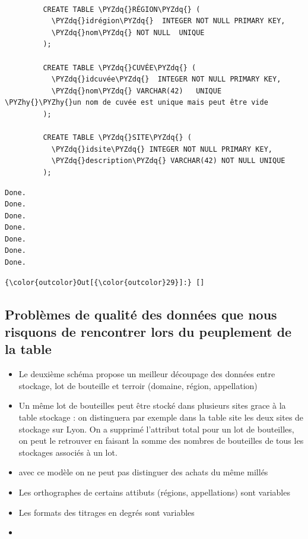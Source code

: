 \documentclass[11pt]{article}
\providecommand{\tightlist}{%
      \setlength{\itemsep}{0pt}\setlength{\parskip}{0pt}}
\def\PYZhy{\char`\-}
\def\PYZdq{\char`\"}
\begin{document}
\begin{Verbatim}[commandchars=\\\{\}]
         
         CREATE TABLE \PYZdq{}RÉGION\PYZdq{} (
           \PYZdq{}idrégion\PYZdq{}  INTEGER NOT NULL PRIMARY KEY,
           \PYZdq{}nom\PYZdq{} NOT NULL  UNIQUE
         );
         
         CREATE TABLE \PYZdq{}CUVÉE\PYZdq{} (
           \PYZdq{}idcuvée\PYZdq{}  INTEGER NOT NULL PRIMARY KEY,
           \PYZdq{}nom\PYZdq{} VARCHAR(42)   UNIQUE                \PYZhy{}\PYZhy{}un nom de cuvée est unique mais peut être vide
         );
         
         CREATE TABLE \PYZdq{}SITE\PYZdq{} (
           \PYZdq{}idsite\PYZdq{} INTEGER NOT NULL PRIMARY KEY,
           \PYZdq{}description\PYZdq{} VARCHAR(42) NOT NULL UNIQUE  
         );
\end{Verbatim}


    \begin{Verbatim}[commandchars=\\\{\}]
Done.
Done.
Done.
Done.
Done.
Done.
Done.

    \end{Verbatim}

\begin{Verbatim}[commandchars=\\\{\}]
{\color{outcolor}Out[{\color{outcolor}29}]:} []
\end{Verbatim}
            
    \hypertarget{probluxe8mes-de-qualituxe9-des-donnuxe9es-que-nous-risquons-de-rencontrer-lors-du-peuplement-de-la-table}{%
\subsection{Problèmes de qualité des données que nous risquons de
rencontrer lors du peuplement de la
table}\label{probluxe8mes-de-qualituxe9-des-donnuxe9es-que-nous-risquons-de-rencontrer-lors-du-peuplement-de-la-table}}

\begin{itemize}
\tightlist
\item
  Le deuxième schéma propose un meilleur découpage des données entre
  stockage, lot de bouteille et terroir (domaine, région, appellation)
\item
  Un même lot de bouteilles peut être stocké dans plusieurs sites grace
  à la table stockage : on distinguera par exemple dans la table site
  les deux sites de stockage sur Lyon. On a supprimé l'attribut total
  pour un lot de bouteilles, on peut le retrouver en faisant la somme
  des nombres de bouteilles de tous les stockages associés à un lot.
\item
  avec ce modèle on ne peut pas distinguer des achats du même millés
\item
  Les orthographes de certains attibuts (régions, appellations) sont
  variables
\item
  Les formats des titrages en degrés sont variables
\item
\end{itemize}
\end{document}
